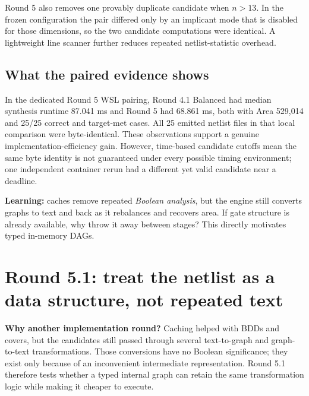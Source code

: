 Round 5 also removes one provably duplicate candidate when $n>13$. In the frozen configuration the pair differed only by an implicant mode that is disabled for those dimensions, so the two candidate computations were identical. A lightweight line scanner further reduces repeated netlist-statistic overhead.

\subsection{What the paired evidence shows}
In the dedicated Round 5 WSL pairing, Round 4.1 Balanced had median synthesis runtime 87.041 ms and Round 5 had 68.861 ms, both with Area 529,014 and 25/25 correct and target-met cases. All 25 emitted netlist files in that local comparison were byte-identical. These observations support a genuine implementation-efficiency gain. However, time-based candidate cutoffs mean the same byte identity is not guaranteed under every possible timing environment; one independent container rerun had a different yet valid candidate near a deadline.

\begin{tcolorbox}[colback=ResearchMint!40,colframe=ResearchSage,title=Decision after Round 5]
\textbf{Learning:} caches remove repeated \emph{Boolean analysis}, but the engine still converts graphs to text and back as it rebalances and recovers area. If gate structure is already available, why throw it away between stages? This directly motivates typed in-memory DAGs.
\end{tcolorbox}

\section{Round 5.1: treat the netlist as a data structure, not repeated text}
\textbf{Why another implementation round?} Caching helped with BDDs and covers, but the candidates still passed through several text-to-graph and graph-to-text transformations. Those conversions have no Boolean significance; they exist only because of an inconvenient intermediate representation. Round 5.1 therefore tests whether a typed internal graph can retain the same transformation logic while making it cheaper to execute.
